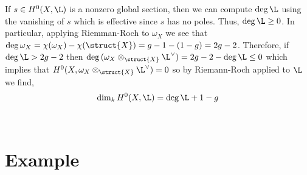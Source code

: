 \begin{rmk}
If $s \in H^0(X, \L)$ is a nonzero global section, then we can compute $\deg{\L}$ using the vanishing of $s$ which is effective since $s$ has no poles. Thus, $\deg{\L} \ge 0$. In particular, applying Riemman-Roch to $\omega_X$ we see that $\deg{\omega_X} = \chi(\omega_X) - \chi(\struct{X}) = g - 1 - (1 - g) = 2 g - 2$. Therefore, if $\deg{\L} > 2 g - 2$ then $\deg{(\omega_X \otimes_{\struct{X}} \L^\vee)} = 2 g - 2 - \deg{\L} \le 0$ which implies that $H^0(X, \omega_X \otimes_{\struct{X}} \L^\vee) = 0$ so by Riemann-Roch applied to $\L$ we find,
\[ \dim_k H^0(X, \L) = \deg{\L} + 1 - g \]
\end{rmk}
\noindent\\

\section{Example}

